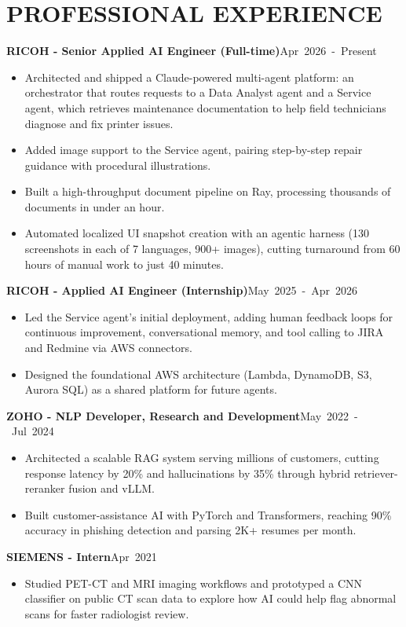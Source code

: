 \documentclass[a4paper,11pt]{letter}
\newcommand{\role}[2]{\textbf{#1}\hfill\mbox{#2}\par}
\begin{document}
\section{PROFESSIONAL EXPERIENCE}
\role{RICOH - Senior Applied AI Engineer (Full-time)}{Apr 2026 - Present}
\begin{itemize}
    \item Architected and shipped a Claude-powered multi-agent platform: an orchestrator that routes requests to a Data Analyst agent and a Service agent, which retrieves maintenance documentation to help field technicians diagnose and fix printer issues.
    \item Added image support to the Service agent, pairing step-by-step repair guidance with procedural illustrations.
    \item Built a high-throughput document pipeline on Ray, processing thousands of documents in under an hour.
    \item Automated localized UI snapshot creation with an agentic harness (130 screenshots in each of 7 languages, 900+ images), cutting turnaround from 60 hours of manual work to just 40 minutes.
\end{itemize}
\vspace{2pt}\role{RICOH - Applied AI Engineer (Internship)}{May 2025 - Apr 2026}
\begin{itemize}
    \item Led the Service agent's initial deployment, adding human feedback loops for continuous improvement, conversational memory, and tool calling to JIRA and Redmine via AWS connectors.
    \item Designed the foundational AWS architecture (Lambda, DynamoDB, S3, Aurora SQL) as a shared platform for future agents.
\end{itemize}
\vspace{2pt}\role{ZOHO - NLP Developer, Research and Development}{May 2022 - Jul 2024}
\begin{itemize}
    \item Architected a scalable RAG system serving millions of customers, cutting response latency by 20\% and hallucinations by 35\% through hybrid retriever-reranker fusion and vLLM.
    \item Built customer-assistance AI with PyTorch and Transformers, reaching 90\% accuracy in phishing detection and parsing 2K+ resumes per month.
\end{itemize}
\vspace{2pt}\role{SIEMENS - Intern}{Apr 2021}
\begin{itemize}
    \item Studied PET-CT and MRI imaging workflows and prototyped a CNN classifier on public CT scan data to explore how AI could help flag abnormal scans for faster radiologist review.
\end{itemize}
\end{document}
